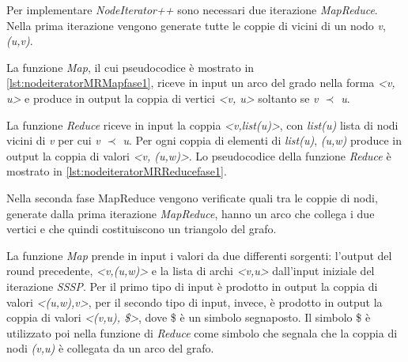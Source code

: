 \documentclass[LaM,binding=0.6cm]{sapthesis}
\begin{document}
Per implementare \textit{NodeIterator++ } sono necessari due iterazione \textit{MapReduce}. Nella prima iterazione vengono generate tutte le coppie di vicini di un nodo \textit{v}, \textit{(u,v)}.

La funzione \textit{Map}, il cui pseudocodice è mostrato in \ref{lst:nodeiteratorMRMapfase1}, riceve in input un arco del grado nella forma \textit{<v, u>} e produce in output la coppia di vertici \textit{<v, u>} soltanto se \textit{v $\prec$ u}.

La funzione \textit{Reduce} riceve in input la coppia \textit{<v,list(u)>}, con \textit{list(u)} lista di nodi vicini di \textit{v} per cui \textit{v $\prec$ u}. Per ogni coppia di elementi  di \textit{list(u)}, \textit{(u,w)} produce in output la coppia di valori \textit{<v, (u,w)>}. Lo pseudocodice della funzione \textit{Reduce} è mostrato in \ref{lst:nodeiteratorMRReducefase1}.

\begin{minipage}{\linewidth}	
	
\end{minipage}

\begin{minipage}{\linewidth}
	
\end{minipage}

Nella seconda fase MapReduce vengono verificate quali tra le coppie di nodi, generate dalla prima iterazione \textit{MapReduce}, hanno un arco che collega i due vertici e che quindi costituiscono un triangolo del grafo. 

La funzione \textit{Map} prende in input i valori da due differenti sorgenti: l'output del round precedente, \textit{<v,(u,w)>} e la lista di archi \textit{<v,u>} dall'input iniziale del iterazione \textit{SSSP}. Per il primo tipo di input è prodotto in output la coppia di valori \textit{<(u,w),v>}, per il secondo tipo di input, invece, è prodotto in output la coppia di valori \textit{<(v,u), \$>}, dove \$ è un simbolo segnaposto. Il simbolo \$ è utilizzato poi nella funzione di \textit{Reduce} come simbolo che segnala che la coppia di nodi \textit{(v,u)} è collegata da un arco del grafo.
\end{document}
